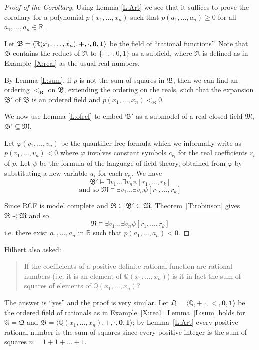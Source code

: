 \documentclass[titlepage, oneside]{amsbook}
\theoremstyle{plain}
\theoremstyle{definition}
\theoremstyle{remark}
\newcommand{\seq}{\ensuremath{\subseteq}}
\newcommand{\ma}{\ensuremath{\mathfrak{A}}}
\newcommand{\mb}{\ensuremath{\mathfrak{B}}}
\newcommand{\mq}{\ensuremath{\mathfrak{Q}}}
\newcommand{\mr}{\ensuremath{\mathfrak{R}}}
\newcommand{\mm}{\ensuremath{\mathfrak{M}}}
\newcommand{\bb}{\ensuremath{\mathbf{B}}}
\newcommand{\exv}[2][0]{\ensuremath{\exists v_{#1}  \dots  \exists
v_{#2}}}
\newcommand{\rnot}[2][0]{\ensuremath{ r_{#1} , \dots , r_{#2}}}
\newcommand{\vnot}[2][0]{\ensuremath{ v_{#1} , \dots , v_{#2}}}
\newcommand{\xnot}[2][0]{\ensuremath{ x_{#1} , \dots , x_{#2}}}
\begin{document}
\begin{proof}[Proof of the Corollary]
Using Lemma \ref{L:Art} we see that it suffices to  prove the corollary
for a polynomial $p( x_1 , \dots , x_n)$ such 
that $p(a_1, \dots , a_n) \geq 0$ for all $a_1 , \dots , a_n \in \mathbb{R}$.

Let $\mb = \langle \mathbb{R} ( x_1, \dots , x_n ), \pmb{+}, \cdot,
\bf{0}, \bf{1} \rangle$ be the field of ``rational 
functions''. Note that $\mb$ contains the reduct of $\mathfrak R$ to
$\{ +,
\cdot, 0 , 1 \}$ as a subfield, where $\mr$ is defined as in  
Example~\ref{X:real} as the usual real numbers.

By Lemma \ref{L:sum}, if $p$ is not the sum of squares in $\mb$, then 
we can find an ordering $<_\bb$ on $\mb$, extending the ordering on
the reals, such that the expansion $\mb'$ 
of $\mb$ is an ordered field and $p(x_1, \dots , x_n) <_ \bb 0 $.

We now use Lemma \ref{L:ofrcf} to embed $\mb'$ as a submodel of a real 
closed field $\mathfrak M$, $\mb' \seq \mathfrak M$. 

Let $\varphi ( \vnot[1]{n} )$ be the quantifier free formula which we
informally write as 
$p( \vnot[1]{n} ) < 0$ where $\varphi$ involves constant symbols 
$c_{r_i}$ for the real coefficients $r_i$ of $p$.
Let $\psi$ be the formula of the language of field theory,  obtained
from $\varphi$ by substituting a new 
variable $u_i$ for each $c_{r_i}$. We have \[ \mb' \models \exv[1]{n}
\psi
[ \rnot[1]{k} ] \]  \[\mbox{and so } \mathfrak M
\models \exists v_1 \dots \exists v_n \psi [ r_1 , \dots , r_k] \]

Since RCF is model complete and $\mr \seq \mb' \seq \mm$,
Theorem~\ref{T:robinson} gives $\mathfrak R \prec \mathfrak M$ and so
\[\mathfrak R  \models \exists v_1 \dots \exists v_n \psi [ r_1 , \dots
, r_k] \]
i.e. there exist $a_1, \dots , a_n$ in $\mathbb R$ such that $p(a_1,
\dots , 
a_n) < 0 $.



\end{proof}


Hilbert also asked: \begin{quotation} If the coefficients of a positive
definite rational function are rational numbers (i.e. it is an element
of $\mathbb{Q} ( \xnot[1]{n} ) $) is it in fact the sum of squares of
elements of $\mathbb{Q}( \xnot[1]{n})$?
\end{quotation}
The answer is ``yes'' and the proof is very similar.  Let $\mq =
\langle
\mathbb{Q}, \pmb{+}. \pmb{\cdot}, \pmb{<}, \pmb{0}, \pmb{1} \rangle$ be
the ordered field of rationals as in Example~\ref{X:real}.
Lemma~\ref{L:sum} holds for $\ma = \mq$ and $\mb = \langle \mathbb{Q} (
\xnot[1]{n}) , \pmb{+}, \pmb{\cdot}, \pmb{0}, \pmb{1} \rangle$; by
Lemma~\ref{L:Art} every positive rational number is the sum of squares
since every positive integer is the sum of squares $n = 1 + 1 + \dots +
1$.
\end{document}
